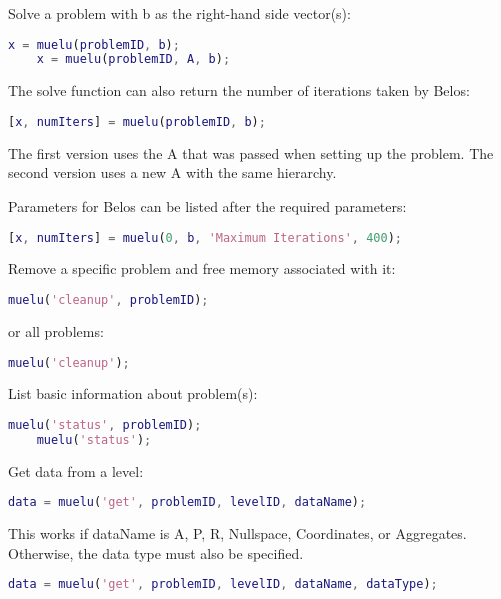 Solve a problem with b as the right-hand side vector(s):

\begin{lstlisting}[language=Matlab]
    x = muelu(problemID, b);
    x = muelu(problemID, A, b);
\end{lstlisting}

The solve function can also return the number of iterations taken by Belos:

\begin{lstlisting}[language=Matlab]
    [x, numIters] = muelu(problemID, b);
\end{lstlisting}

The first version uses the A that was passed when setting up the problem.
The second version uses a new A with the same hierarchy.

Parameters for Belos can be listed after the required parameters:

\begin{lstlisting}[language=Matlab]
    [x, numIters] = muelu(0, b, 'Maximum Iterations', 400);
\end{lstlisting}

Remove a specific problem and free memory associated with it:

\begin{lstlisting}[language=Matlab]
    muelu('cleanup', problemID);
\end{lstlisting}

or all problems:

\begin{lstlisting}[language=Matlab]
    muelu('cleanup');
\end{lstlisting}

List basic information about problem(s):

\begin{lstlisting}[language=Matlab]
    muelu('status', problemID);
    muelu('status');
\end{lstlisting}

Get data from a level:

\begin{lstlisting}[language=Matlab]
    data = muelu('get', problemID, levelID, dataName);
\end{lstlisting}

This works if dataName is A, P, R, Nullspace, Coordinates, or Aggregates.
Otherwise, the data type must also be specified.
    
\begin{lstlisting}[language=Matlab]
    data = muelu('get', problemID, levelID, dataName, dataType);
\end{lstlisting}

